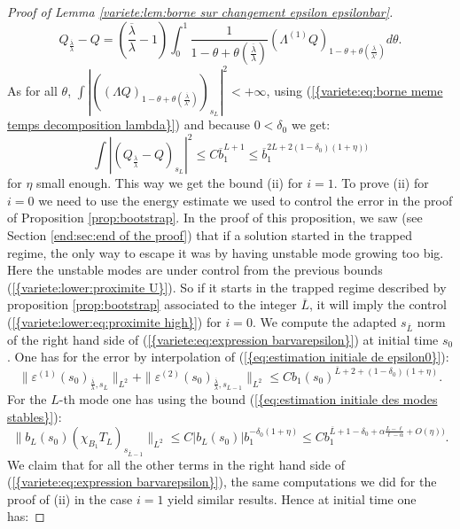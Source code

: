 \documentclass[11pt,a4paper,reqno]{amsart}
\theoremstyle{remark}
\numberwithin{equation}{section}
\begin{document}
\begin{proof}[Proof of Lemma \ref{variete:lem:borne sur changement epsilon epsilonbar}]
\begin{equation} \label{variete:eq:expression Qscale-Q}
Q_{\frac{{{\overline {\lambda}}}}{\lambda}}-Q= (\frac{{{\overline {\lambda}}}}{\lambda}-1) \int_0^1 \frac{1}{1-\theta+\theta (\frac{{{\overline {\lambda}}}}{\lambda})}(\Lambda^{(1)} Q)_{1-\theta+\theta (\frac{{{\overline {\lambda}}}}{\lambda'})}d\theta.
\end{equation}
As for all $\theta$, $\int |((\Lambda Q)_{1-\theta+\theta (\frac{{{\overline {\lambda}}}}{\lambda'})})_{s_L}|^2<+\infty$, using {{\rm (\ref{{variete:eq:borne meme temps decomposition lambda}})}} and because $0<\delta_0$ we get:
$$
\int |(Q_{\frac{{{\overline {\lambda}}}}{\lambda}}-Q)_{s_L}|^2\leq C{{\overline {b}}}_1^{L+1}\leq {{\overline {b}}}_1^{2L+2(1-\delta_0)(1+\eta))}
$$
for $\eta$ small enough. This way we get the bound (ii) for $i=1$. To prove (ii) for $i=0$ we need to use the energy estimate we used to control the error in the proof of Proposition \ref{prop:bootstrap}. In the proof of this proposition, we saw (see Section \ref{end:sec:end of the proof}) that if a solution started in the trapped regime, the only way to escape it was by having unstable mode growing too big. Here the unstable modes are under control from the previous bounds {{\rm (\ref{{variete:lower:proximite U}})}}. So if it starts in the trapped regime described by proposition \ref{prop:bootstrap} associated to the integer ${{\overline {L}}}$, it will imply the control {{\rm (\ref{{variete:lower:eq:proximite high}})}} for $i=0$. We compute the adapted $s_{{{\overline {L}}}}$ norm of the right hand side of {{\rm (\ref{{variete:eq:expression barvarepsilon}})}} at initial time $s_0$. One has for the error by interpolation of {{\rm (\ref{{eq:estimation initiale de epsilon0}})}}:
$$
\parallel \varepsilon^{(1)}(s_0)_{\frac{{{\overline {\lambda}}}}{\lambda},s_{{{\overline {L}}}}} \parallel_{L^2} +\parallel \varepsilon^{(2)}(s_0)_{\frac{{{\overline {\lambda}}}}{\lambda},s_{{{\overline {L}}}-1}} \parallel_{L^2} \leq Cb_1(s_0)^{{{\overline {L}}}+2+(1-\delta_0)(1+\eta)}.
$$
For the $L$-th mode one has using the bound {{\rm (\ref{{eq:estimation initiale des modes stables}})}}:
$$
\parallel b_L(s_0)(\chi_{B_1}T_{L})_{s_{{{\overline {L}}}-1}} \parallel_{L^2}\leq C|b_L(s_0)|b_1^{-\delta_0(1+\eta)}\leq C b_1^{{{\overline {L}}}+1-\delta_0+\alpha\frac{L-\ell}{\ell-\alpha}+O(\eta))}.
$$
We claim that for all the other terms in the right hand side of {{\rm (\ref{{variete:eq:expression barvarepsilon}})}}, the same computations we did for the proof of (ii) in the case $i=1$ yield similar results. Hence at initial time one has:

\end{proof}
\end{document}
